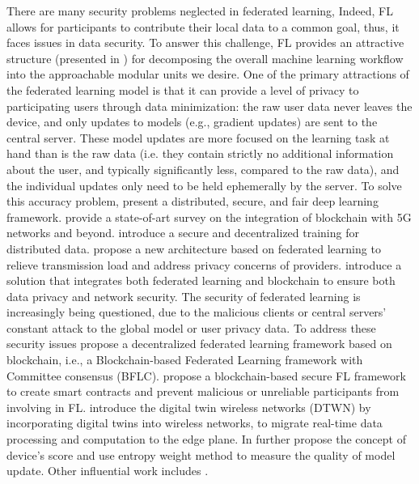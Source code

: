 \documentclass{article}
\begin{document}
There are many security problems neglected in federated learning, Indeed, FL allows for participants to contribute their local data to a common goal, thus, it faces issues in data security. To answer this challenge, FL provides an attractive structure (presented in \cite{kairouz_advances_2021}) for decomposing the overall machine learning workflow into the approachable modular units we desire. One of the primary attractions of the federated learning model is that it can provide a level of privacy to participating users through data minimization: the raw user data never leaves the device, and only updates to models (e.g., gradient updates) are sent to the central server. These model updates are more focused on the learning task at hand than is the raw data (i.e. they contain strictly no additional information about the user, and typically significantly less, compared to the raw data), and the individual updates only need to be held ephemerally by the server. To solve this accuracy problem, \cite{weng_2019} present a distributed, secure, and fair deep learning framework. \cite{nguyen_2020} provide a state-of-art survey on the integration of blockchain with 5G networks and beyond. \cite{kumar_2020} introduce a secure and decentralized training for distributed data. \cite{zhang_2020} propose a new architecture based on federated learning to relieve transmission load and address privacy concerns of providers. \cite{otoum_2020} introduce a solution that integrates both federated learning and blockchain to ensure both data privacy and network security. The security of federated learning is increasingly being questioned, due to the malicious clients or central servers' constant attack to the global model or user privacy data. To address these security issues \cite{li_2021} propose a decentralized federated learning framework based on blockchain, i.e., a Blockchain-based Federated Learning framework with Committee consensus (BFLC). \cite{liu_2020} propose a blockchain-based secure FL framework to create smart contracts and prevent malicious or unreliable participants from involving in FL. \cite{9170905} introduce the digital twin wireless networks (DTWN) by incorporating digital twins into wireless networks, to migrate real-time data processing and computation to the edge plane. In further \cite{xu_bafl_2021} propose the concept of device's score and use entropy weight method to measure the quality of model update. Other influential work includes \cite{lu_2020}.
\end{document}
